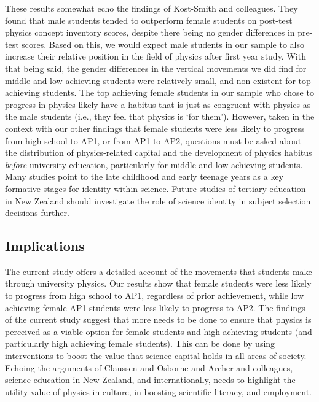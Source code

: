 These results somewhat echo the findings of Kost-Smith and colleagues.\cite{Kost_Smith_2010} They found that male students tended to outperform female students on post-test physics concept inventory scores, despite there being no gender differences in pre-test scores. Based on this, we would expect male students in our sample to also increase their relative position in the field of physics after first year study. With that being said, the gender differences in the vertical movements we did find for middle and low achieving students were relatively small, and non-existent for top achieving students. The top achieving female students in our sample who chose to progress in physics likely have a habitus that is just as congruent with physics as the male students (i.e., they feel that physics is `for them'). However, taken in the context with our other findings that female students were less likely to progress from high school to AP1, or from AP1 to AP2, questions must be asked about the distribution of physics-related capital and the development of physics habitus \textit{before} university education, particularly for middle and low achieving students. Many studies point to the late childhood and early teenage years as a key formative stages\cite{archer2013aspires,DeWitt2014,Baram_Tsabari_2010} for identity within science. Future studies of tertiary education in New Zealand should investigate the role of science identity in subject selection decisions further.

\subsection{Implications}
The current study offers a detailed account of the movements that students make through university physics. Our results show that female students were less likely to progress from high school to AP1, regardless of prior achievement, while low achieving female AP1 students were less likely to progress to AP2. The findings of the current study suggest that more needs to be done to ensure that physics is perceived as a viable option for female students and high achieving students (and particularly high achieving female students). This can be done by using interventions to boost the value that science capital holds in all areas of society. Echoing the arguments of Claussen and Osborne\cite{Claussen_2013} and Archer and colleagues\cite{Archer2012}, science education in New Zealand, and internationally, needs to highlight the utility value of physics in culture, in boosting scientific literacy, and employment. 

